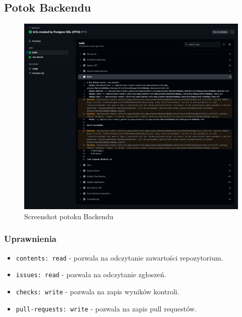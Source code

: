\subsection{Potok Backendu}
\label{subsec:potok-backendu}

\begin{figure}[H]
    \centering
    \includegraphics[width=1\textwidth]{attachments/backend-ci}
    \caption{Screenshot potoku Backendu}
\end{figure}

\subsubsection{Uprawnienia}
\begin{itemize}
    \item \texttt{\textcolor{codeblue}{contents: read}} - pozwala na odczytanie zawartości repozytorium.
    \item \texttt{\textcolor{codeblue}{issues: read}} - pozwala na odczytanie zgłoszeń.
    \item \texttt{\textcolor{codeblue}{checks: write}} - pozwala na zapis wyników kontroli.
    \item \texttt{\textcolor{codeblue}{pull-requests: write}} - pozwala na zapis pull requestów.
\end{itemize}

